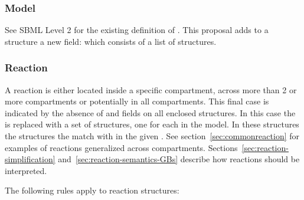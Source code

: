 \documentclass{cekarticle}
\begin{document}
\subsubsection{Model}

See SBML Level 2 for the existing definition of .
This proposal adds to a  structure a new field:
\emph{} which consists of a list of
 structures.

\subsubsection{Reaction}
\label{sec:class-reaction}

A reaction is either located inside a specific compartment, across
more than 2 or more compartments or
 potentially in all compartments.  This final case is indicated by the absence of
 and  fields on all enclosed
 structures. In this case the
 is replaced with a set of 
structures, one for each  in the model.  In
these  structures the
 structures the match with
 in the given . See
section~\ref{sec:commonreaction} for examples of reactions
generalized across compartments.
Sections~\ref{sec:reaction-simplification}
and~\ref{sec:reaction-semantics-GBs} describe how reactions should
be interpreted.

The following rules apply to reaction structures:
\end{document}
